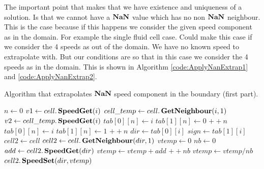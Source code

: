 The important point that makes that we have existence and uniqueness of a solution.
Is that we cannot have a $\mathop{\textbf{NaN}}$ value which has no non $\mathop{\textbf{NaN}}$ neighbour.
This is the case because if this happens we consider the given speed component as in the domain.
For example the single fluid cell case. Could make this case if we consider the 4 speeds as out of the domain.
We have no known speed to extrapolate with. But our conditions are so that in this case we consider the 4 speeds as in the domain.
This is shown in Algorithm \ref{code:ApplyNanExtrap1} and \ref{code:ApplyNanExtrap2}.
\begin{algorithm}
\caption{Algorithm that extrapolates $\mathop{\textbf{NaN}}$ speed component in the boundary (first part).}
\label{code:ApplyNanExtrap1}
\begin{algorithmic}[1]
	\State $n \gets 0$
	\State $v1 \gets cell.\mathop{\textbf{SpeedGet}}(i)$
	\State $cell\_temp \gets cell.\mathop{\textbf{GetNeighbour}}(i,1)$
	\State $v2 \gets cell\_temp.\mathop{\textbf{SpeedGet}}(i)$
		\State $tab[0][n] \gets i$
		\State $tab[1][n] \gets 0$
		\State $++n$
	\EndIf
		\State $tab[0][n]\gets i$
		\State $tab[1][n] \gets 1$
		\State $++n$
	\EndIf
	\EndFor
	 
	\Return
	\EndIf
	 
	\State $dir \gets tab[0][i]$
	\State $sign \gets tab[1][i]$
	\State $cell2\gets cell$
	\State $cell2 \gets cell.\mathop{\textbf{GetNeighbour}}(dir,1)$
	\EndIf
	\State $vtemp \gets 0$
	\State $nb \gets 0$
		\State $add \gets cell2.\mathop{\textbf{SpeedGet}}(dir)$
			\State $vtemp \gets vtemp+add $
			\State $++nb$
		\EndIf
		\EndFor
	\EndFor
		\State $vtemp \gets vtemp/nb$ 
	\EndIf
	\State $cell2.\mathop{\textbf{SpeedSet}}(dir,vtemp)$
	\EndFor
	\end{algorithmic}
\end{algorithm}
